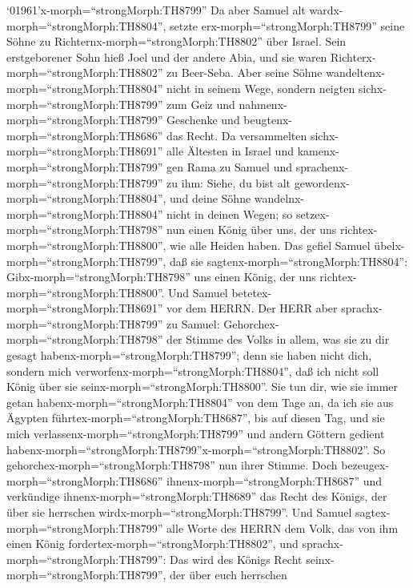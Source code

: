  `01961'\textbar x-morph=``strongMorph:TH8799'' Da aber
Samuel alt wardx-morph=``strongMorph:TH8804'', setzte
erx-morph=``strongMorph:TH8799'' seine Söhne zu
Richternx-morph=``strongMorph:TH8802'' über Israel.  Sein
erstgeborener Sohn hieß Joel und der andere Abia, und sie waren
Richterx-morph=``strongMorph:TH8802'' zu Beer-Seba.  Aber
seine Söhne wandeltenx-morph=``strongMorph:TH8804'' nicht in seinem
Wege, sondern neigten sichx-morph=``strongMorph:TH8799'' zum Geiz und
nahmenx-morph=``strongMorph:TH8799'' Geschenke und
beugtenx-morph=``strongMorph:TH8686'' das Recht.  Da
versammelten sichx-morph=``strongMorph:TH8691'' alle Ältesten in Israel
und kamenx-morph=``strongMorph:TH8799'' gen Rama zu Samuel 
und sprachenx-morph=``strongMorph:TH8799'' zu ihm: Siehe, du bist alt
gewordenx-morph=``strongMorph:TH8804'', und deine Söhne
wandelnx-morph=``strongMorph:TH8804'' nicht in deinen Wegen; so
setzex-morph=``strongMorph:TH8798'' nun einen König über uns, der uns
richtex-morph=``strongMorph:TH8800'', wie alle Heiden haben.
 Das gefiel Samuel übelx-morph=``strongMorph:TH8799'', daß
sie sagtenx-morph=``strongMorph:TH8804'':
Gibx-morph=``strongMorph:TH8798'' uns einen König, der uns
richtex-morph=``strongMorph:TH8800''. Und Samuel
betetex-morph=``strongMorph:TH8691'' vor dem HERRN.  Der
HERR aber sprachx-morph=``strongMorph:TH8799'' zu Samuel:
Gehorchex-morph=``strongMorph:TH8798'' der Stimme des Volks in allem,
was sie zu dir gesagt habenx-morph=``strongMorph:TH8799''; denn sie
haben nicht dich, sondern mich verworfenx-morph=``strongMorph:TH8804'',
daß ich nicht soll König über sie seinx-morph=``strongMorph:TH8800''.
 Sie tun dir, wie sie immer getan
habenx-morph=``strongMorph:TH8804'' von dem Tage an, da ich sie aus
Ägypten führtex-morph=``strongMorph:TH8687'', bis auf diesen Tag, und
sie mich verlassenx-morph=``strongMorph:TH8799'' und andern Göttern
gedient
habenx-morph=``strongMorph:TH8799''x-morph=``strongMorph:TH8802''.
 So gehorchex-morph=``strongMorph:TH8798'' nun ihrer Stimme.
Doch bezeugex-morph=``strongMorph:TH8686''
ihnenx-morph=``strongMorph:TH8687'' und verkündige
ihnenx-morph=``strongMorph:TH8689'' das Recht des Königs, der über sie
herrschen wirdx-morph=``strongMorph:TH8799''.  Und Samuel
sagtex-morph=``strongMorph:TH8799'' alle Worte des HERRN dem Volk, das
von ihm einen König fordertex-morph=``strongMorph:TH8802'',
 und sprachx-morph=``strongMorph:TH8799'': Das wird des
Königs Recht seinx-morph=``strongMorph:TH8799'', der über euch herrschen
